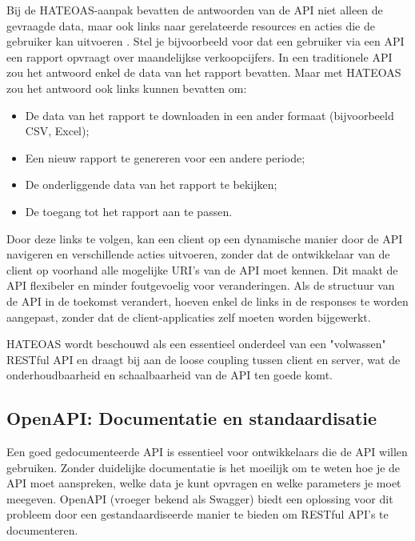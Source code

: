 \bigskip

Bij de HATEOAS-aanpak bevatten de antwoorden van de API niet alleen de gevraagde data, maar ook links naar gerelateerde resources en acties die de gebruiker kan uitvoeren \autocite{Aydemir_2022}. Stel je bijvoorbeeld voor dat een gebruiker via een API een rapport opvraagt over maandelijkse verkoopcijfers. In een traditionele API zou het antwoord enkel de data van het rapport bevatten. Maar met HATEOAS zou het antwoord ook links kunnen bevatten om:

\begin{itemize}
  \item De data van het rapport te downloaden in een ander formaat (bijvoorbeeld CSV, Excel);
  \item Een nieuw rapport te genereren voor een andere periode;
  \item De onderliggende data van het rapport te bekijken;
  \item De toegang tot het rapport aan te passen.
\end{itemize}

\bigskip

Door deze links te volgen, kan een client op een dynamische manier door de API navigeren en verschillende acties uitvoeren, zonder dat de ontwikkelaar van de client op voorhand alle mogelijke URI's van de API moet kennen. Dit maakt de API flexibeler en minder foutgevoelig voor veranderingen. Als de structuur van de API in de toekomst verandert, hoeven enkel de links in de responses te worden aangepast, zonder dat de client-applicaties zelf moeten worden bijgewerkt.

\bigskip

HATEOAS wordt beschouwd als een essentieel onderdeel van een "volwassen" RESTful API en draagt bij aan de loose coupling tussen client en server, wat de onderhoudbaarheid en schaalbaarheid van de API ten goede komt.

\subsection{OpenAPI: Documentatie en standaardisatie}

Een goed gedocumenteerde API is essentieel voor ontwikkelaars die de API willen gebruiken. Zonder duidelijke documentatie is het moeilijk om te weten hoe je de API moet aanspreken, welke data je kunt opvragen en welke parameters je moet meegeven. OpenAPI (vroeger bekend als Swagger) biedt een oplossing voor dit probleem door een gestandaardiseerde manier te bieden om RESTful API's te documenteren.

